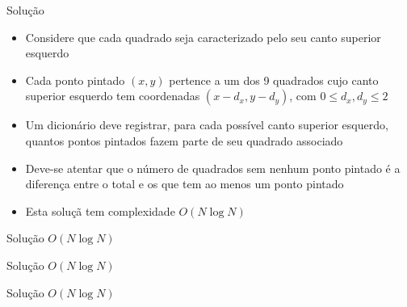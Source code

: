 \begin{frame}[fragile]{Solução}

    \begin{itemize}
        \item Considere que cada quadrado seja caracterizado pelo seu canto superior esquerdo

        \item Cada ponto pintado $(x, y)$ pertence a um dos 9 quadrados cujo canto superior
            esquerdo tem coordenadas $(x - d_x, y - d_y)$, com $0\leq d_x, d_y\leq 2$

        \item Um dicionário deve registrar, para cada possível canto superior esquerdo, quantos
            pontos pintados fazem parte de seu quadrado associado

        \item Deve-se atentar que o número de quadrados sem nenhum ponto pintado é a diferença
            entre o total e os que tem ao menos um ponto pintado

        \item Esta soluçã tem complexidade $O(N\log N)$
    \end{itemize}

\end{frame}

\begin{frame}[fragile]{Solução $O(N\log N)$}
\end{frame}

\begin{frame}[fragile]{Solução $O(N\log N)$}
\end{frame}

\begin{frame}[fragile]{Solução $O(N\log N)$}
\end{frame}
